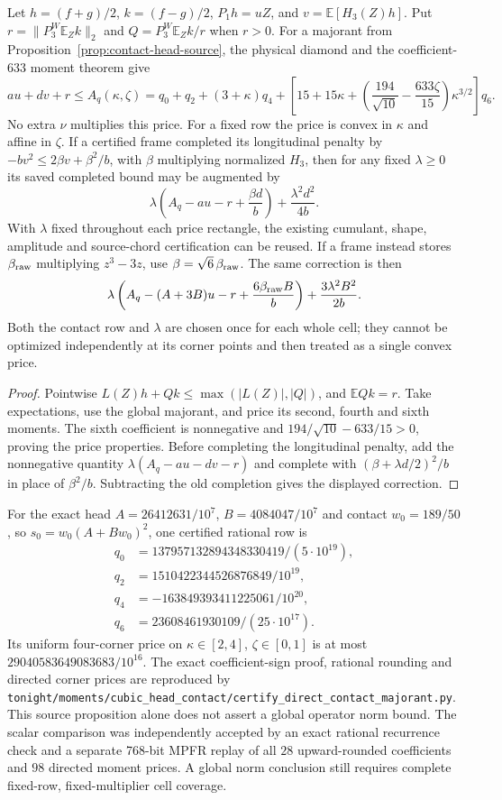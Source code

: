 \begin{corollary}
Let $h=(f+g)/2$, $k=(f-g)/2$, $P_1h=uZ$, and
$v=\mathbb E[H_3(Z)h]$.  Put
$r=\|P_3^W\mathbb E_Zk\|_2$ and
$Q=P_3^W\mathbb E_Zk/r$ when $r>0$.
For a majorant from Proposition~\ref{prop:contact-head-source}, the physical
diamond and the coefficient-$633$ moment theorem give
\[
 au+dv+r\le A_q(\kappa,\zeta)
 =q_0+q_2+(3+\kappa)q_4+
 \left[15+15\kappa+
  \left(\frac{194}{\sqrt{10}}-\frac{633\zeta}{15}\right)\kappa^{3/2}\right]q_6.
\]
No extra $\nu$ multiplies this price.  For a fixed row the price is convex
in $\kappa$ and affine in $\zeta$.
If a certified frame completed its longitudinal penalty by
$-bv^2\le2\beta v+\beta^2/b$, with $\beta$ multiplying normalized $H_3$,
then for any fixed $\lambda\ge0$ its saved completed bound may be augmented by
\[
 \lambda\left(A_q-au-r+\frac{\beta d}{b}\right)
       +\frac{\lambda^2d^2}{4b}.
\]
With $\lambda$ fixed throughout each price rectangle, the existing cumulant,
shape, amplitude and source-chord certification can be reused.
If a frame instead stores $\beta_{\rm raw}$ multiplying $z^3-3z$, use
$\beta=\sqrt6\,\beta_{\rm raw}$.  The same correction is then
\[
 \lambda\left(A_q-(A+3B)u-r+\frac{6\beta_{\rm raw}B}{b}\right)
       +\frac{3\lambda^2B^2}{2b}.
\]
Both the contact row and $\lambda$ are chosen once for each whole cell;
they cannot be optimized independently at its corner points and then treated
as a single convex price.
\end{corollary}
\begin{proof}
Pointwise $L(Z)h+Qk\le\max(|L(Z)|,|Q|)$, and $\mathbb EQk=r$.
Take expectations, use the global majorant, and price its second, fourth and
sixth moments.  The sixth coefficient is nonnegative and
$194/\sqrt{10}-633/15>0$, proving the price properties.
Before completing the longitudinal penalty, add the nonnegative quantity
$\lambda(A_q-au-dv-r)$ and complete with
$(\beta+\lambda d/2)^2/b$ in place of $\beta^2/b$.
Subtracting the old completion gives the displayed correction.
\end{proof}

For the exact head $A=26412631/10^7$, $B=4084047/10^7$ and contact
$w_0=189/50$, so $s_0=w_0(A+Bw_0)^2$, one certified rational row is
\[
\begin{split}
q_0&=137957132894348330419/(5\cdot10^{19}),\\
q_2&=1510422344526876849/10^{19},\\
q_4&=-163849393411225061/10^{20},\\
q_6&=23608461930109/(25\cdot10^{17}).
\end{split}
\]
Its uniform four-corner price on $\kappa\in[2,4]$, $\zeta\in[0,1]$ is at most
$29040583649083683/10^{16}$.
The exact coefficient-sign proof, rational rounding and directed corner
prices are reproduced by
\texttt{tonight/moments/cubic\_head\_contact/certify\_direct\_contact\_majorant.py}.
This source proposition alone does not assert a global operator norm bound.
The scalar comparison was independently accepted by an exact rational
recurrence check and a separate 768-bit MPFR replay of all $28$ upward-rounded
coefficients and $98$ directed moment prices.  A global norm conclusion still
requires complete fixed-row, fixed-multiplier cell coverage.
